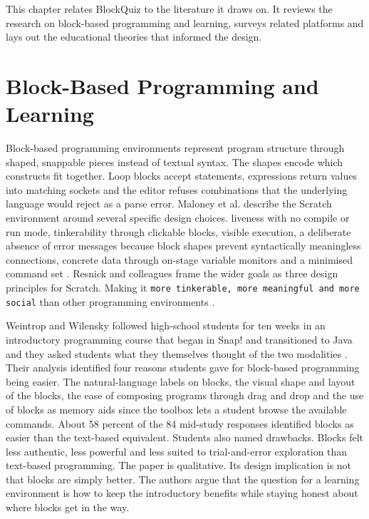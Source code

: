 This chapter relates BlockQuiz to the literature it draws on.
It reviews the research on block-based programming and learning, surveys related
platforms and lays out the educational theories that informed the design.

\section{Block-Based Programming and Learning}
Block-based programming environments represent program structure through shaped, snappable pieces
instead of textual syntax. The shapes encode which constructs fit together.
Loop blocks accept statements, expressions return values into matching sockets and the editor refuses
combinations that the underlying language would reject as a parse error.
Maloney et al. describe the Scratch environment around several specific design choices.
liveness with no compile or run mode, tinkerability through clickable blocks, visible execution, a deliberate absence of 
error messages
because block shapes prevent syntactically meaningless connections, concrete data through on-stage variable monitors 
and a minimised command set
\cite{maloney2010}. Resnick and colleagues frame the wider goals as three design principles for Scratch. Making it
\texttt{more tinkerable, more meaningful and more social} than other programming environments \cite{resnick2009}.

Weintrop and Wilensky followed high-school students for ten weeks in an introductory programming course that began in Snap! 
\cite{snap2026} and transitioned to Java and they asked students what they themselves thought of the two modalities 
\cite{weintrop2015}. Their analysis identified four reasons students gave for block-based programming
being easier. The natural-language labels on blocks, the visual shape and layout of the blocks, the ease of composing 
programs through drag and drop and the use of blocks as memory aids since the toolbox lets a student browse the available 
commands. About 58 percent of the 84 mid-study responses identified blocks as easier than the text-based equivalent.
Students also named drawbacks. Blocks felt less authentic, less powerful and less suited to trial-and-error exploration 
than text-based programming.
The paper is qualitative. Its design implication is not that blocks are simply better.
The authors argue that the question for a learning environment is how to keep the introductory benefits while staying 
honest about where blocks get in the way.

